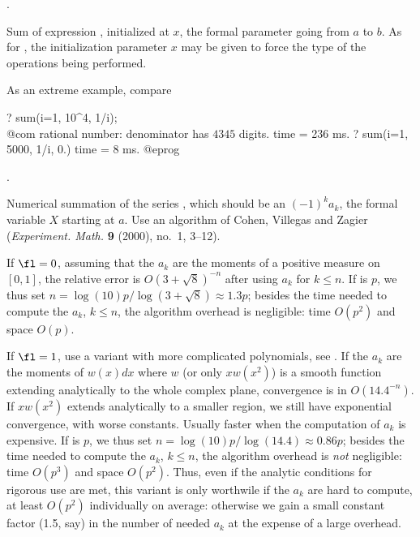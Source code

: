 .

\label{se:sum}
Sum of expression ,
initialized at $x$, the formal parameter going from $a$ to $b$. As for
, the initialization parameter $x$ may be given to force the type
of the operations being performed.

\noindent As an extreme example, compare

\bprog
? sum(i=1, 10^4, 1/i); \\@com rational number: denominator has $4345$ digits.
time = 236 ms.
? sum(i=1, 5000, 1/i, 0.)
time = 8 ms.
@eprog

.

\label{se:sumalt}
Numerical summation of the series , which should be an
 $(-1)^k a_k$, the formal variable $X$ starting at
$a$. Use an algorithm of Cohen, Villegas and Zagier (\emph{Experiment. Math.}
{\bf 9} (2000), no.~1, 3--12).

If $\fl=0$, assuming that the $a_k$ are the moments of a positive
measure on $[0,1]$, the relative error is $O(3+\sqrt8)^{-n}$ after using
$a_k$ for $k\leq n$. If  is $p$, we thus set
$n = \log(10)p/\log(3+\sqrt8)\approx 1.3 p$; besides the time needed to
compute the $a_k$, $k\leq n$, the algorithm overhead is negligible: time
$O(p^2)$ and space $O(p)$.

If $\fl=1$, use a variant with more complicated polynomials, see
. If the $a_k$ are the moments of $w(x)dx$ where $w$
(or only $xw(x^2)$) is a smooth function extending analytically to the whole
complex plane, convergence is in $O(14.4^{-n})$. If $xw(x^2)$ extends
analytically to a smaller region, we still have exponential convergence,
with worse constants. Usually faster when the computation of $a_k$ is
expensive. If  is $p$, we thus set
$n = \log(10)p/\log(14.4)\approx 0.86 p$; besides the time needed to
compute the $a_k$, $k\leq n$, the algorithm overhead is \emph{not}
negligible: time $O(p^3)$ and space $O(p^2)$. Thus, even if the analytic
conditions for rigorous use are met, this variant is only worthwile if the
$a_k$ are hard to compute, at least $O(p^2)$ individually on average:
otherwise we gain a small constant factor (1.5, say) in the number of
needed $a_k$ at the expense of a large overhead.

